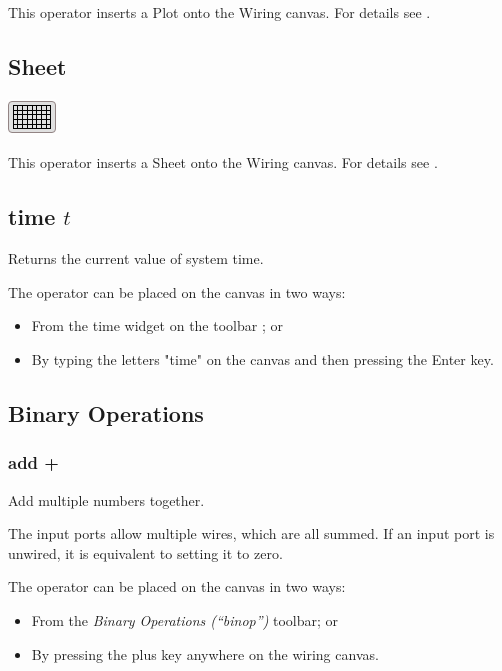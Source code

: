 This operator inserts a Plot onto the Wiring canvas. For details see
.

\subsection{Sheet}
\begin{center}
  \includegraphics{images/sheet}
\end{center}

This operator inserts a Sheet onto the Wiring canvas. For details
see .

\subsection{time $t$}

\label{Operation:time} Returns the current value of system time.

The operator can be placed on the canvas in two ways:
\begin{itemize}
\item From the time widget on the toolbar ;
or 
\item By typing the letters "time" on the canvas and then pressing the
Enter key.
\end{itemize}

\subsection{Binary Operations}

\label{Binary-Operations}

\subsubsection{add +}


\label{Operation:add} Add multiple numbers together.

The input ports allow multiple wires, which are all summed. If an
input port is unwired, it is equivalent to setting it to zero.

The operator can be placed on the canvas in two ways:
\begin{itemize}
\item From the \emph{Binary Operations (``binop'') }toolbar; or 
\item By pressing the plus key anywhere on the wiring canvas. 
\end{itemize}

